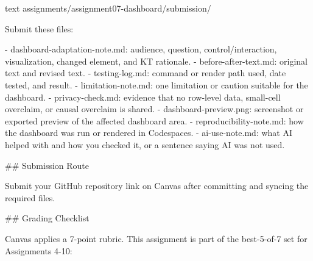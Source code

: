 \documentclass[
  letterpaper,
  DIV=11,
  numbers=noendperiod,
  oneside]{scrreprt}
\newenvironment{Shaded}{\begin{snugshade}}{\end{snugshade}}
\newcommand{\FunctionTok}[1]{\textcolor[rgb]{0.28,0.35,0.67}{#1}}
\newcommand{\InformationTok}[1]{\textcolor[rgb]{0.37,0.37,0.37}{#1}}
\newcommand{\NormalTok}[1]{\textcolor[rgb]{0.00,0.23,0.31}{#1}}
\newcommand{\SpecialStringTok}[1]{\textcolor[rgb]{0.13,0.47,0.30}{#1}}
\begin{document}
\begin{Shaded}
\begin{Highlighting}[numbers=left,,]
\InformationTok{\textasciigrave{}\textasciigrave{}\textasciigrave{}text}
\InformationTok{assignments/assignment07{-}dashboard/submission/}
\InformationTok{\textasciigrave{}\textasciigrave{}\textasciigrave{}}

\NormalTok{Submit these files:}

\SpecialStringTok{{-} }\InformationTok{\textasciigrave{}dashboard{-}adaptation{-}note.md\textasciigrave{}}\NormalTok{: audience, question, control/interaction, visualization, changed element, and KT rationale.}
\SpecialStringTok{{-} }\InformationTok{\textasciigrave{}before{-}after{-}text.md\textasciigrave{}}\NormalTok{: original text and revised text.}
\SpecialStringTok{{-} }\InformationTok{\textasciigrave{}testing{-}log.md\textasciigrave{}}\NormalTok{: command or render path used, date tested, and result.}
\SpecialStringTok{{-} }\InformationTok{\textasciigrave{}limitation{-}note.md\textasciigrave{}}\NormalTok{: one limitation or caution suitable for the dashboard.}
\SpecialStringTok{{-} }\InformationTok{\textasciigrave{}privacy{-}check.md\textasciigrave{}}\NormalTok{: evidence that no row{-}level data, small{-}cell overclaim, or causal overclaim is shared.}
\SpecialStringTok{{-} }\InformationTok{\textasciigrave{}dashboard{-}preview.png\textasciigrave{}}\NormalTok{: screenshot or exported preview of the affected dashboard area.}
\SpecialStringTok{{-} }\InformationTok{\textasciigrave{}reproducibility{-}note.md\textasciigrave{}}\NormalTok{: how the dashboard was run or rendered in Codespaces.}
\SpecialStringTok{{-} }\InformationTok{\textasciigrave{}ai{-}use{-}note.md\textasciigrave{}}\NormalTok{: what AI helped with and how you checked it, or a sentence saying AI was not used.}

\FunctionTok{\#\# Submission Route}

\NormalTok{Submit your GitHub repository link on Canvas after committing and syncing the required files.}

\FunctionTok{\#\# Grading Checklist}

\NormalTok{Canvas applies a 7{-}point rubric. This assignment is part of the best{-}5{-}of{-}7 set for Assignments 4{-}10:}


\end{Highlighting}
\end{Shaded}
\end{document}
